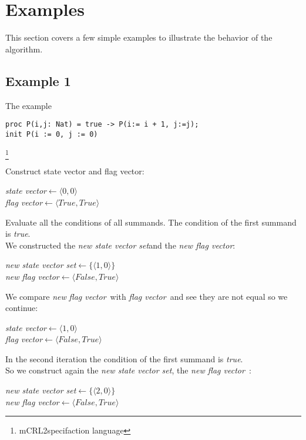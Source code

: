 \documentclass[a4paper,10pt]{article}
\theoremstyle{plain}
\theoremstyle{definition}
\newcommand{\mcrl}{mCRL2}
\newcommand{\ti}{\textit}
\newcommand{\sv}{\textit{state vector}}
\newcommand{\fv}{\textit{flag vector}}
\newcommand{\svs}{\textit{new state vector set}}
\newcommand{\nfv}{\textit{new flag vector}}
\newcommand{\la}{$\leftarrow$}
\begin{document}
\section{Examples}
This section covers a few simple examples to illustrate the behavior of the algorithm. 
\subsection{Example 1} The example \\
\begin{verbatim}
proc P(i,j: Nat) = true -> P(i:= i + 1, j:=j);
init P(i := 0, j := 0)
\end{verbatim} \footnote{\mcrl specifaction language}

Construct state vector and flag vector: 
\begin{center}\begin{minipage}{250pt}
\sv \la  $\langle 0 , 0 \rangle$\\
\fv \la  $\langle True , True \rangle$\\
\end{minipage}\end{center}

Evaluate all the conditions of all summands.
The condition of the first summand is \ti{true}.\\

We constructed the \svs and the \nfv :
\begin{center}\begin{minipage}{250pt}
\svs \la  $\lbrace \langle 1 , 0 \rangle \rbrace $\\
\nfv \la $\langle False , True \rangle $
\end{minipage}\end{center}

We compare \ti{new} \fv\ with \fv\ and see they are not equal so we continue:
\begin{center}\begin{minipage}{250pt}
\sv \la $\langle 1 , 0 \rangle $\\
\fv \la $\langle False , True \rangle $\\
\end{minipage}\end{center}

In the second iteration the condition of the first summand is \ti{true}.\\
So we construct again the \svs, the \nfv\ : 
\begin{center}\begin{minipage}{250pt}
\svs \la  $\lbrace \langle 2 , 0 \rangle \rbrace $\\
\nfv \la  $\langle False , True \rangle $ \\
\end{minipage}\end{center}
\end{document}
